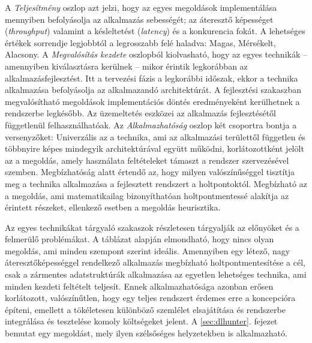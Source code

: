 A \emph{Teljesítmény} oszlop azt jelzi, hogy az egyes megoldások implementálása mennyiben befolyásolja az alkalmazás sebességét; az áteresztő képességet (\emph{throughput}) valamint a késleltetést (\emph{latency}) és a konkurencia fokát. A lehetséges értékek sorrendje legjobbtól a legrosszabb felé haladva: Magas, Mérsékelt, Alacsony. A \emph{Megvalósítás kezdete} oszlopból kiolvasható, hogy az egyes technikák -- amennyiben kiválasztásra kerülnek -- mikor érintik legkorábban az alkalmazásfejlesztést. Itt a tervezési fázis a legkorábbi időszak, ekkor a technika alkalmazása befolyásolja az alkalmazandó architektúrát. A fejlesztési szakaszban megvalósítható megoldások implementációs döntés eredményeként kerülhetnek a rendszerbe legkésőbb. Az üzemeltetés eszközei az alkalmazás fejlesztésétől függetlenül felhasználhatóak. Az \emph{Alkalmazhatóság} oszlop két csoportra bontja a versenyzőket: Univerzális az a technika, ami az alkalmazási területtől független és többnyire képes mindegyik architektúrával együtt működni, korlátozottként jelölt az a megoldás, amely használata feltételeket támaszt a rendszer szervezésével szemben. Megbízhatóság alatt értendő az, hogy milyen valószínűséggel tisztítja meg a technika alkalmazása a fejlesztett rendszert a holtpontoktól. Megbízható az a megoldás, ami matematikailag bizonyíthatóan holtpontmentessé alakítja az érintett részeket, ellenkező esetben a megoldás heurisztika.

Az egyes technikákat tárgyaló szakaszok részletesen tárgyalják az előnyöket és a felmerülő problémákat. A táblázat alapján elmondható, hogy nincs olyan megoldás, ami minden szempont szerint ideális. Amennyiben egy létező, nagy áteresztőképességgel rendelkező alkalmazás megbízható holtpontmentesítése a cél, csak a zármentes adatstruktúrák alkalmazása az egyetlen lehetséges technika, ami minden kezdeti feltételt teljesít. Ennek alkalmazhatósága azonban erősen korlátozott, valószínűtlen, hogy egy teljes rendszert érdemes erre a koncepcióra építeni, emellett a tökéletesen különböző szemlélet elsajátítása és rendszerbe integrálása és tesztelése komoly költségeket jelent. A \ref{sec:dlhunter}. fejezet bemutat egy megoldást, mely ilyen szélsőséges helyzetekben is alkalmazható.

